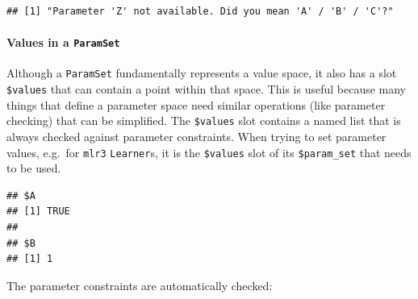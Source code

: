 \documentclass[
]{scrbook}
\newenvironment{Shaded}{\begin{snugshade}}{\end{snugshade}}
\newcommand{\AttributeTok}[1]{\textcolor[rgb]{0.77,0.63,0.00}{#1}}
\newcommand{\ConstantTok}[1]{\textcolor[rgb]{0.00,0.00,0.00}{#1}}
\newcommand{\DecValTok}[1]{\textcolor[rgb]{0.00,0.00,0.81}{#1}}
\newcommand{\FunctionTok}[1]{\textcolor[rgb]{0.00,0.00,0.00}{#1}}
\newcommand{\NormalTok}[1]{#1}
\newcommand{\OtherTok}[1]{\textcolor[rgb]{0.56,0.35,0.01}{#1}}
\newcommand{\SpecialCharTok}[1]{\textcolor[rgb]{0.00,0.00,0.00}{#1}}
\renewenvironment{Shaded} {\begin{snugshade}\small} {\end{snugshade}}
\begin{document}
\begin{Shaded}
\end{Shaded}

\begin{verbatim}
## [1] "Parameter 'Z' not available. Did you mean 'A' / 'B' / 'C'?"
\end{verbatim}

\hypertarget{values-in-a-paramset}{%
\paragraph{\texorpdfstring{Values in a \texttt{ParamSet}}{Values in a ParamSet}}\label{values-in-a-paramset}}

Although a \texttt{ParamSet} fundamentally represents a value space, it also has a slot \texttt{\$values} that can contain a point within that space.
This is useful because many things that define a parameter space need similar operations (like parameter checking) that can be simplified.
The \texttt{\$values} slot contains a named list that is always checked against parameter constraints.
When trying to set parameter values, e.g.~for \texttt{mlr3} \texttt{Learner}s, it is the \texttt{\$values} slot of its \texttt{\$param\_set} that needs to be used.

\begin{Shaded}
\end{Shaded}

\begin{verbatim}
## $A
## [1] TRUE
## 
## $B
## [1] 1
\end{verbatim}

The parameter constraints are automatically checked:

\begin{Shaded}
\end{Shaded}
\end{document}
